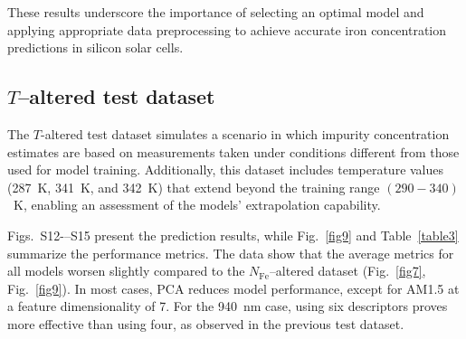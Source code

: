 \documentclass[a4paper,fleqn]{cas-sc}
\begin{document}
These results underscore the importance of selecting an optimal model and applying appropriate data preprocessing 
to achieve accurate iron concentration predictions in silicon solar cells.


\subsection{$T$--altered test dataset}

The $T$-altered test dataset simulates a scenario in which impurity concentration estimates 
are based on measurements taken under conditions different from those used for model training.
Additionally, this dataset includes temperature values (287~K, 341~K, and 342~K) 
that extend beyond the training range $(290-340)$~K, enabling an assessment of the models' extrapolation capability.

Figs.~S12-–S15 present the prediction results, while Fig.~\ref{fig9} and Table~\ref{table3} summarize the performance metrics.
The data show that the average metrics for all models worsen slightly compared 
to the $N_\mathrm{Fe}$--altered dataset (Fig.~\ref{fig7}, Fig.~\ref{fig9}).
In most cases, PCA reduces model performance, except for AM1.5 at a feature dimensionality of 7.
For the 940~nm case, using six descriptors proves more effective than using four, as observed in the previous test dataset.
\end{document}
